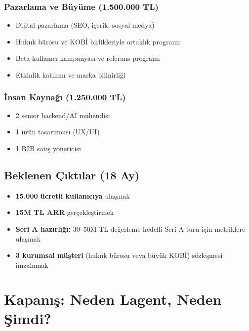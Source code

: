 \documentclass[12pt,a4paper]{article}
\begin{document}
\subsubsection{Pazarlama ve Büyüme (1.500.000 TL)}
\begin{itemize}[itemsep=3pt]
  \item Dijital pazarlama (SEO, içerik, sosyal medya)
  \item Hukuk bürosu ve KOBİ birlikleriyle ortaklık programı
  \item Beta kullanıcı kampanyası ve referans programı
  \item Etkinlik katılımı ve marka bilinirliği
\end{itemize}

\subsubsection{İnsan Kaynağı (1.250.000 TL)}
\begin{itemize}[itemsep=3pt]
  \item 2 senior backend/AI mühendisi
  \item 1 ürün tasarımcısı (UX/UI)
  \item 1 B2B satış yöneticisi
\end{itemize}

\subsection{Beklenen Çıktılar (18 Ay)}

\begin{itemize}[itemsep=5pt]
  \item \textbf{15.000 ücretli kullanıcıya} ulaşmak
  \item \textbf{15M TL ARR} gerçekleştirmek
  \item \textbf{Seri A hazırlığı:} 30–50M TL değerleme hedefli Seri A turu için metriklere ulaşmak
  \item \textbf{3 kurumsal müşteri} (hukuk bürosu veya büyük KOBİ) sözleşmesi imzalamak
\end{itemize}

\section*{Kapanış: Neden Lagent, Neden Şimdi?}
\end{document}
